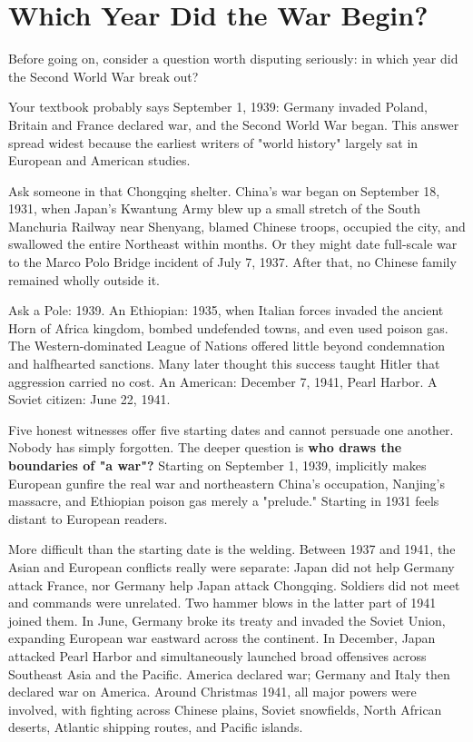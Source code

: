 \section{Which Year Did the War Begin?}
Before going on, consider a question worth disputing seriously: in which year did the Second World War break out?

Your textbook probably says September 1, 1939: Germany invaded Poland, Britain and France declared war, and the Second World War began. This answer spread widest because the earliest writers of "world history" largely sat in European and American studies.

Ask someone in that Chongqing shelter. China's war began on September 18, 1931, when Japan's Kwantung Army blew up a small stretch of the South Manchuria Railway near Shenyang, blamed Chinese troops, occupied the city, and swallowed the entire Northeast within months. Or they might date full-scale war to the Marco Polo Bridge incident of July 7, 1937. After that, no Chinese family remained wholly outside it.

Ask a Pole: 1939. An Ethiopian: 1935, when Italian forces invaded the ancient Horn of Africa kingdom, bombed undefended towns, and even used poison gas. The Western-dominated League of Nations offered little beyond condemnation and halfhearted sanctions. Many later thought this success taught Hitler that aggression carried no cost. An American: December 7, 1941, Pearl Harbor. A Soviet citizen: June 22, 1941.

Five honest witnesses offer five starting dates and cannot persuade one another. Nobody has simply forgotten. The deeper question is \textbf{who draws the boundaries of "a war"?} Starting on September 1, 1939, implicitly makes European gunfire the real war and northeastern China's occupation, Nanjing's massacre, and Ethiopian poison gas merely a "prelude." Starting in 1931 feels distant to European readers.

More difficult than the starting date is the welding. Between 1937 and 1941, the Asian and European conflicts really were separate: Japan did not help Germany attack France, nor Germany help Japan attack Chongqing. Soldiers did not meet and commands were unrelated. Two hammer blows in the latter part of 1941 joined them. In June, Germany broke its treaty and invaded the Soviet Union, expanding European war eastward across the continent. In December, Japan attacked Pearl Harbor and simultaneously launched broad offensives across Southeast Asia and the Pacific. America declared war; Germany and Italy then declared war on America. Around Christmas 1941, all major powers were involved, with fighting across Chinese plains, Soviet snowfields, North African deserts, Atlantic shipping routes, and Pacific islands.

